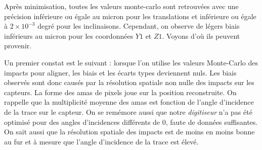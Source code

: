   \FloatBarrier


  


  Apr\`es minimisation, toutes les valeurs monte-carlo sont retrouv\'ees avec une pr\'ecision inf\'erieure ou \'egale au micron pour les translations et inf\'erieure ou \'egale \`a $2 \times 10^{-3}$ degr\'e pour les inclinaisons. Cependant, on observe de l\'egers biais inf\'erieurs au micron pour les coordonn\'ees $Y1$ et $Z1$. Voyons d'o\`u ils peuvent provenir.
  
  \medskip
  
  Un premier constat est le suivant : lorsque l'on utilise les valeurs Monte-Carlo des impacts pour aligner, les biais et les \'ecarts types deviennent nuls. Les biais observ\'es sont donc caus\'es par la r\'esolution spatiale non nulle des impacts sur les capteurs. La forme des amas de pixels joue sur la position reconstruite. On rappelle que la multiplicit\'e moyenne des amas est fonction de l'angle d'incidence de la trace sur le capteur. On se rem\'emore aussi que notre \textit{digitiseur} n'a pas \'et\'e optimis\'e pour des angles d'incidences diff\'erents de 0, faute de donn\'ees suffisantes. On sait aussi que la r\'esolution spatiale des impacts est de moins en moins bonne au fur et \`a mesure que l'angle d'incidence de la trace est \'elev\'e.
  
